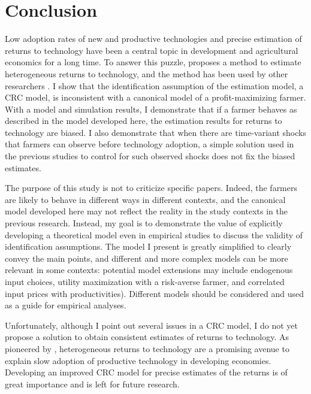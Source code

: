 \documentclass[11pt,letterpaper]{article}
\begin{document}
\section{Conclusion}\label{sec:conclusion}

Low adoption rates of new and productive technologies and precise estimation of returns to technology have been a central topic in development and agricultural economics for a long time.
To answer this puzzle, \citet{Suri11} proposes a method to estimate heterogeneous returns to technology, and the method has been used by other researchers \citep{Michler2019, wossen2019estimating}.
I show that the identification assumption of the estimation model, a CRC model, is inconsistent with a canonical model of a profit-maximizing farmer.
With a model and simulation results, I demonstrate that if a farmer behaves as described in the model developed here, the estimation results for returns to technology are biased.
I also demonstrate that when there are time-variant shocks that farmers can observe before technology adoption, a simple solution used in the previous studies to control for such observed shocks does not fix the biased estimates.

The purpose of this study is not to criticize specific papers.
Indeed, the farmers are likely to behave in different ways in different contexts, and the canonical model developed here may not reflect the reality in the study contexts in the previous research.
Instead, my goal is to demonstrate the value of explicitly developing a theoretical model even in empirical studies to discuss the validity of identification assumptions.
The model I present is greatly simplified to clearly convey the main points, and different and more complex models can be more relevant in some contexts: potential model extensions may include endogenous input choices, utility maximization with a risk-averse farmer, and correlated input prices with productivities).
Different models should be considered and used as a guide for empirical analyses.

Unfortunately, although I point out several issues in a CRC model, I do not yet propose a solution to obtain consistent estimates of returns to technology.
As pioneered by \citet{Suri11}, heterogeneous returns to technology are a promising avenue to explain slow adoption of productive technology in developing economies.
Developing an improved CRC model for precise estimates of the returns is of great importance and is left for future research.

\clearpage


\end{document}
